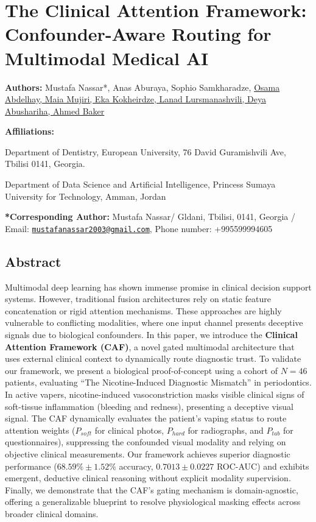 \documentclass[
]{article}
\author{}
\date{}
\begin{document}
\section{The Clinical Attention Framework: Confounder-Aware Routing for
Multimodal Medical
AI}\label{the-clinical-attention-framework-confounder-aware-routing-for-multimodal-medical-ai}

\textbf{Authors:} Mustafa Nassar*, Anas Aburaya, Sophio Samkharadze,
\href{https://www.linkedin.com/in/otamimi/?lipi=urn\%3Ali\%3Apage\%3Ad_flagship3_profile_view_base\%3BWqHuqzO\%2FSamXOVocxHx\%2B9Q\%3D\%3D}{Osama
Abdelhay, Maia Mujiri, Eka Kokheirdze, Lanad Lursmanashvili, Deya
Abushariha, Ahmed Baker}

\textbf{Affiliations:}

Department of Dentistry, European University, 76 David Guramishvili Ave,
Tbilisi 0141, Georgia.

Department of Data Science and Artificial Intelligence, Princess Sumaya
University for Technology, Amman, Jordan

\textbf{*Corresponding Author:} Mustafa Nassar/ Gldani, Tbilisi, 0141,
Georgia / Email:
\href{mailto:mustafanassar2003@gmail.com}{\nolinkurl{mustafanassar2003@gmail.com}},
Phone number: +995599994605

\subsection{\texorpdfstring{\textbf{Abstract}}{Abstract}}\label{abstract}

Multimodal deep learning has shown immense promise in clinical decision
support systems. However, traditional fusion architectures rely on
static feature concatenation or rigid attention mechanisms. These
approaches are highly vulnerable to conflicting modalities, where one
input channel presents deceptive signals due to biological confounders.
In this paper, we introduce the \textbf{Clinical Attention Framework
(CAF)}, a novel gated multimodal architecture that uses external
clinical context to dynamically route diagnostic trust. To validate our
framework, we present a biological proof-of-concept using a cohort of
\(N = 46\) patients, evaluating ``The Nicotine-Induced Diagnostic
Mismatch'' in periodontics. In active vapers, nicotine-induced
vasoconstriction masks visible clinical signs of soft-tissue
inflammation (bleeding and redness), presenting a deceptive visual
signal. The CAF dynamically evaluates the patient's vaping status to
route attention weights (\(P_{soft}\) for clinical photos, \(P_{hard}\)
for radiographs, and \(P_{tab}\) for questionnaires), suppressing the
confounded visual modality and relying on objective clinical
measurements. Our framework achieves superior diagnostic performance
(\(68.59\% \pm 1.52\%\) accuracy, \(0.7013 \pm 0.0227\) ROC-AUC) and
exhibits emergent, deductive clinical reasoning without explicit
modality supervision. Finally, we demonstrate that the CAF's gating
mechanism is domain-agnostic, offering a generalizable blueprint to
resolve physiological masking effects across broader clinical domains.
\end{document}
